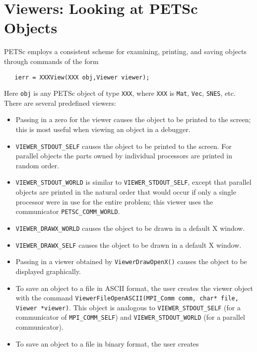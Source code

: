 \section{Viewers: Looking at PETSc Objects} \label{sec:viewers}

PETSc employs a consistent scheme for examining, printing, and 
saving objects through commands of the form
\begin{verbatim}
   ierr = XXXView(XXX obj,Viewer viewer);
\end{verbatim}
Here {\tt obj} is any PETSc object of type
{\tt XXX},  where {\tt XXX} 
is {\tt Mat}, {\tt Vec}, {\tt SNES}, etc. There are several
predefined viewers:
\begin{itemize}
\item Passing in a zero for the viewer causes the object to be printed 
      to the screen; this is most useful when viewing an object in 
      a debugger.
\item {\tt VIEWER\_STDOUT\_SELF} 
      causes the object to be printed to the screen.
      For parallel objects the parts owned by individual processors are 
      printed in random order.
\item {\tt VIEWER\_STDOUT\_WORLD} 
      is similar to {\tt VIEWER\_STDOUT\_SELF}, except that 
      parallel objects are printed in the natural order that would occur
      if only a single processor were in use for the entire problem;
      this viewer uses the communicator {\tt PETSC\_COMM\_WORLD}.
\item {\tt VIEWER\_DRAWX\_WORLD}  causes the 
      object to be drawn in a default X window.
\item {\tt VIEWER\_DRAWX\_SELF}  causes the 
      object to be drawn in a default X window.
\item Passing in a viewer obtained by
      {\tt ViewerDrawOpenX()} causes the object to be displayed graphically.
\item To save an object to a file in ASCII format, the user creates
      the viewer object with the command
      {\tt ViewerFileOpenASCII(MPI\_Comm comm, char* file, Viewer *viewer)}.  
      This object is 
      analogous to {\tt VIEWER\_STDOUT\_SELF} (for a communicator of
      {\tt MPI\_COMM\_SELF}) and 
      {\tt VIEWER\_STDOUT\_WORLD} (for a parallel communicator).
\item To save an object to a file in binary format, the user creates

\end{itemize}
